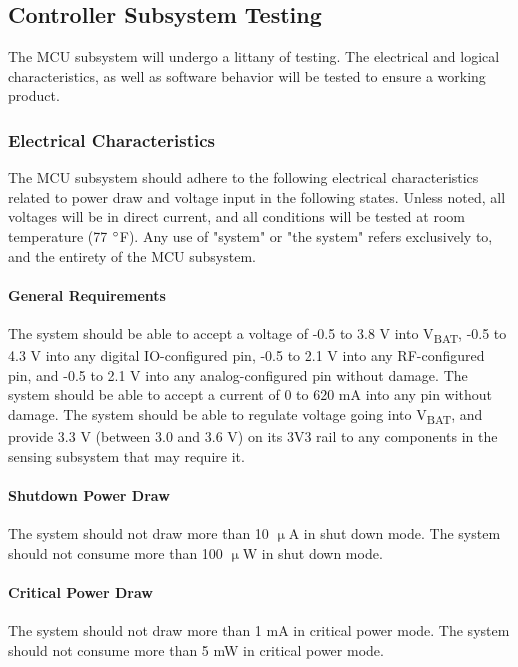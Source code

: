 \subsection{Controller Subsystem Testing}
\label{sec:controller_subsystem_testing}
The MCU subsystem will undergo a littany of testing. The electrical and
logical characteristics, as well as software behavior will be tested to ensure
a working product.

\subsubsection{Electrical Characteristics}
The MCU subsystem should adhere to the following electrical characteristics
related to power draw and voltage input in the following states. Unless noted,
all voltages will be in direct current, and all conditions will be tested at
room temperature (77 $\degree$F). Any use of "system" or "the system" refers
exclusively to, and the entirety of the MCU subsystem.

\paragraph{General Requirements} The system should be able to accept a voltage
of -0.5 to 3.8 V into V\textsubscript{BAT}, -0.5 to 4.3 V into any digital
IO-configured pin, -0.5 to 2.1 V into any RF-configured pin, and -0.5 to 2.1 V
into any analog-configured pin without damage. The system should be able to
accept a current of 0 to 620 mA into any pin without damage. The system should
be able to regulate voltage going into V\textsubscript{BAT}, and provide 3.3 V
(between 3.0 and 3.6 V) on its 3V3 rail to any components in the sensing
subsystem that may require it.

\paragraph{Shutdown Power Draw} The system should not draw more than 10
$\upmu$A in shut down mode. The system should not consume more than 100
$\upmu$W in shut down mode.

\paragraph{Critical Power Draw} The system should not draw more than 1 mA in
critical power mode. The system should not consume more than 5 mW in critical
power mode.

